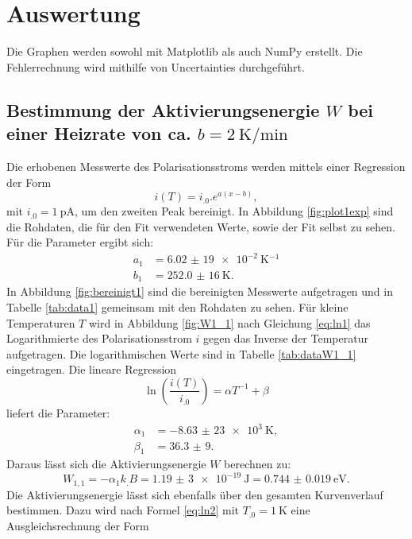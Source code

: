 \section{Auswertung}
\label{sec:Auswertung}

Die Graphen werden sowohl mit Matplotlib \cite{matplotlib} als auch NumPy \cite{numpy} erstellt. Die Fehlerrechnung wird mithilfe von Uncertainties \cite{uncertainties} durchgeführt.

\subsection{Bestimmung der Aktivierungsenergie $W$ bei einer Heizrate von ca. $b=\SI{2}{\kelvin\per\minute}$}
\label{sec:1}

Die erhobenen Messwerte des Polarisationsstroms werden mittels einer Regression der Form
\begin{equation}
i(T)=i_.0 .e^{a(x-b)}, \label{eq:reg1}
\end{equation}
mit $i_.0=\SI{1}{\pico\ampere}$, um den zweiten Peak bereinigt. In Abbildung \ref{fig:plot1exp} sind die Rohdaten, die für den Fit verwendeten Werte, sowie der Fit selbst zu sehen.
Für die Parameter ergibt sich:
\begin{align*}
a_1&=\SI{6,02(19)e-2}{\kelvin^{-1}}\\
b_1&=\SI{252,0(16)}{\kelvin}\text{.}
\end{align*}
In Abbildung \ref{fig:bereinigt1} sind die bereinigten Messwerte aufgetragen und in Tabelle \ref{tab:data1} gemeinsam mit den Rohdaten zu sehen.
Für kleine Temperaturen $T$ wird in Abbildung \ref{fig:W1_1} nach Gleichung \eqref{eq:ln1} das Logarithmierte des Polarisationsstrom $i$ gegen das Inverse der Temperatur aufgetragen. Die logarithmischen Werte sind in Tabelle \ref{tab:dataW1_1} eingetragen.
Die lineare Regression
\begin{equation}
\ln\left(\frac{i(T)}{i_.0}\right)=\alpha T^{-1}+\beta \label{eq:reg2}
\end{equation}
liefert die Parameter:
\begin{align*}
\alpha_1&=\SI{-8,63(23)e3}{\kelvin},\\
\beta_1 &= \num{36,3(9)}\text{.}
\end{align*}
Daraus lässt sich die Aktivierungsenergie $W$ berechnen zu:
\[
W_{1,1} = -\alpha_1 k_.B =\SI{1,19(3)e-19}{\joule}=\SI{0.744(19)}{\electronvolt}\text{.}
\]
Die Aktivierungsenergie lässt sich ebenfalls über den gesamten Kurvenverlauf bestimmen. Dazu wird nach Formel \eqref{eq:ln2} mit $T_.0=\SI{1}{\kelvin}$ eine Ausgleichsrechnung der Form 
